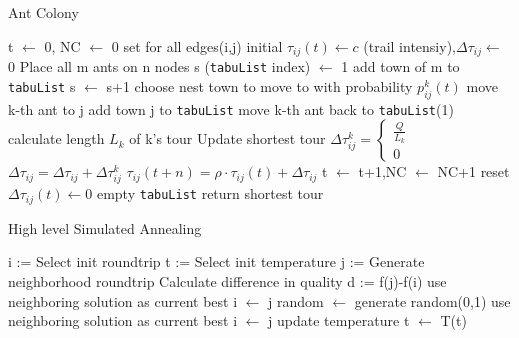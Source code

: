\begin{breakablealgorithm}
	\caption{Ant Colony}
	\label{alg:AntColony}
	\begin{algorithmic}[1]
		\STATE t $\gets$ 0, NC $\gets$ 0
		\STATE set for all edges(i,j) initial $\tau_{ij}(t) \gets c$ (trail intensiy),$\Delta \tau_{ij} \gets$ 0 
		\STATE Place all m ants on n nodes
		\STATE s (\texttt{tabuList} index) $\gets$ 1
		\STATE add town of m to \texttt{tabuList}
		\STATE s $\gets$ s+1
		\STATE choose nest town to move to with probability $p_{ij}^k(t)$
		\STATE move k-th ant to j
		\STATE add town j to \texttt{tabuList}
		\ENDFOR
		\ENDWHILE
		\STATE move k-th ant back to \texttt{tabuList}(1)
		\STATE calculate length $L_k$ of k's tour
		\STATE Update shortest tour
		\STATE $\Delta\tau_{ij}^k = \begin{cases}
			\frac{Q}{L_k}\\
			0
		\end{cases}$
		\STATE $\Delta\tau_{ij} = \Delta\tau_{ij} + \Delta\tau_{ij}^k$
		\ENDFOR
		\ENDFOR
		\ENDFOR
		\STATE $\tau_{ij}(t+n)=\rho \cdot \tau_{ij}(t) + \Delta\tau_{ij}$
		\ENDFOR
		\STATE t $\gets$ t+1,NC $\gets$ NC+1
		\STATE reset $\Delta\tau_{ij}(t) \gets 0$
		\ENDFOR
		\STATE empty \texttt{tabuList}
		\ELSE
		\STATE return shortest tour
		\ENDIF
		\ENDFOR
	\end{algorithmic}	
\end{breakablealgorithm}



\begin{breakablealgorithm}
	\caption{High level Simulated Annealing}
	\label{alg:SApseudocode}
	\begin{algorithmic}[1]
		\STATE i := Select init roundtrip
		\STATE t := Select init temperature 
		\STATE j := Generate neighborhood roundtrip
		\STATE Calculate difference in quality d := f(j)-f(i)
		\STATE use neighboring solution as current best i $\gets$ j
		\ELSE 
		\STATE random $\gets$ generate random(0,1)
		\STATE use neighboring solution as current best i $\gets$ j
		\ENDIF
		\ENDIF
		\ENDFOR
		\STATE update temperature t $\gets$ T(t)
		\ENDFOR
	\end{algorithmic}
\end{breakablealgorithm}




